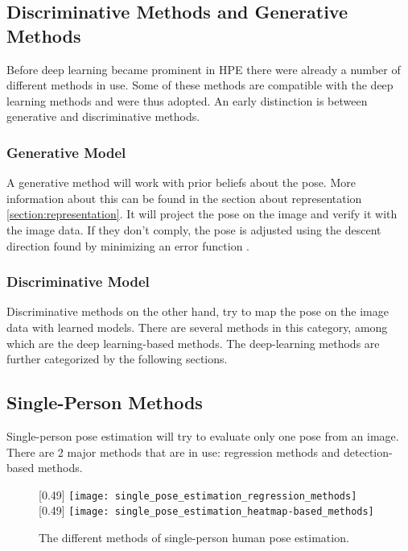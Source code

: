 \subsection{Discriminative Methods and Generative Methods}
Before deep learning became prominent in \gls{HPE} there were already a number of different methods in use.
Some of these methods are compatible with the deep learning methods and were thus adopted.
An early distinction is between generative and discriminative methods.

\subsubsection{Generative Model}
A generative method will work with prior beliefs about the pose.
More information about this can be found in the section about representation \ref{section:representation}.
It will project the pose on the image and verify it with the image data.
If they don't comply, the pose is adjusted using the descent direction found by minimizing an error function \cite{Pons-Moll2011}.

\subsubsection{Discriminative Model}
Discriminative methods on the other hand, try to map the pose on the image data with learned models.
There are several methods in this category, among which are the deep learning-based methods.
The deep-learning methods are further categorized by the following sections.

\subsection{Single-Person Methods}
Single-person pose estimation will try to evaluate only one pose from an image.
There are 2 major methods that are in use: regression methods and detection-based methods.

\begin{figure}
	\centering
	[0.49\textwidth]{%
		\texttt{[image: single\_pose\_estimation\_regression\_methods]}%
	}
	[0.49\textwidth]{%
		\texttt{[image: single\_pose\_estimation\_heatmap-based\_methods]}%
	}
	\caption{The different methods of single-person human pose estimation.\cite{Zheng2012}}
	\label{fig:single_pose_estimation}
\end{figure}
